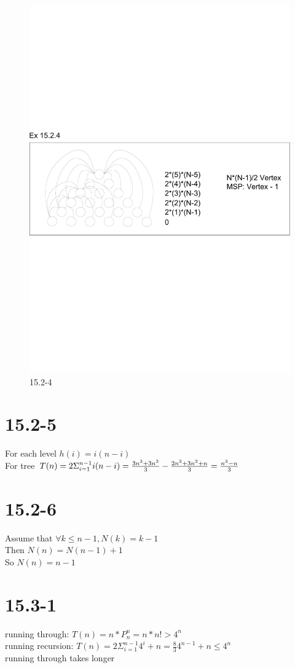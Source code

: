 \documentclass[]{article}
\begin{document}
\begin{figure}
	\centering
	\includegraphics[width=0.8\linewidth]{1524}
	\caption{15.2-4}
	\label{fig:15.2-4}
\end{figure}

\section{15.2-5}
For each level $h(i) = i (n-i)$\\
For tree $T(n) = 2\Sigma_{i = 1}^{n-1}i(n-i)
\\ = \frac{3n^3 + 3n^2}{3} - \frac{2n^3 + 3n^2 +n}{3}
\\ = \frac{n^3 - n }{3}$

\section{15.2-6}
Assume that $\forall k \le n-1, N(k) = k-1$\\
Then $N(n) = N(n-1) + 1$\\
So $N(n) = n-1$

\section{15.3-1}
running through: $T(n) = n*P_{n}^{n} = n*n! > 4^{n}$\\
running recursion: $T(n) = 2\Sigma_{i=1}^{n-1}4^i + n = \frac{8}{3}4^{n-1} + n \le 4^n$\\
running through takes longer
\end{document}

